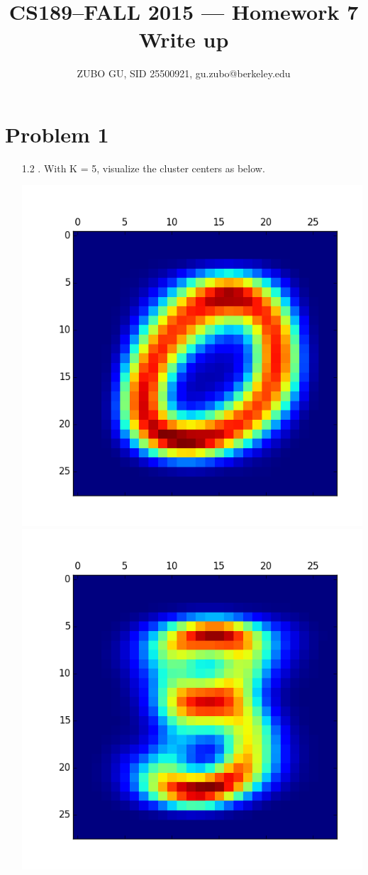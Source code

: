 \documentclass[11pt]{article}
\title{CS189--FALL 2015 --- Homework 7 Write up}
\author{ZUBO GU, SID 25500921, gu.zubo@berkeley.edu}
\date{}
\begin{document}
\maketitle

\section*{Problem 1}
\begin{itemize}
\item[1.2].
With K = 5, visualize the cluster centers as below.

\includegraphics[scale = 0.5]{1.png}
\includegraphics[scale = 0.5]{2.png}


\end{itemize}
\end{document}
